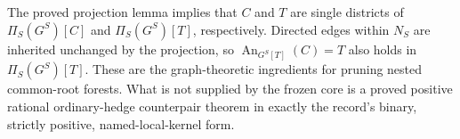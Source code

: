 The proved projection lemma implies that \(C\) and \(T\) are single districts of \(\Pi_S(G^S)[C]\) and \(\Pi_S(G^S)[T]\), respectively.  Directed edges within \(N_S\) are inherited unchanged by the projection, so \(\operatorname{An}_{G^S[T]}(C)=T\) also holds in \(\Pi_S(G^S)[T]\).  These are the graph-theoretic ingredients for pruning nested common-root forests.  What is not supplied by the frozen core is a proved positive rational ordinary-hedge counterpair theorem in exactly the record's binary, strictly positive, named-local-kernel form.